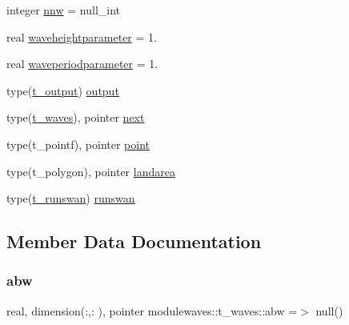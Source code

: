 \begin{DoxyCompactItemize}
\item 
integer \mbox{\hyperlink{structmodulewaves_1_1t__waves_a4acb51d68604f8c07b0594fa4bb7a267}{nnw}} = null\+\_\+int
\item 
real \mbox{\hyperlink{structmodulewaves_1_1t__waves_ab628f8e789892dfdbd634741269523cf}{waveheightparameter}} = 1.
\item 
real \mbox{\hyperlink{structmodulewaves_1_1t__waves_a3b7a438e413d4403bfacfdf8de55ce1f}{waveperiodparameter}} = 1.
\item 
type(\mbox{\hyperlink{structmodulewaves_1_1t__output}{t\+\_\+output}}) \mbox{\hyperlink{structmodulewaves_1_1t__waves_a4d30fd6cc75c89cdaa128717a08a327c}{output}}
\item 
type(\mbox{\hyperlink{structmodulewaves_1_1t__waves}{t\+\_\+waves}}), pointer \mbox{\hyperlink{structmodulewaves_1_1t__waves_ae0b46a0d80af4eebb4d8da8aab828062}{next}}
\item 
type(t\+\_\+pointf), pointer \mbox{\hyperlink{structmodulewaves_1_1t__waves_a77b9bbe50cfc29a1fb6eb6c9a925c4aa}{point}}
\item 
type(t\+\_\+polygon), pointer \mbox{\hyperlink{structmodulewaves_1_1t__waves_afbe188084fb36697091ab156c4b389ef}{landarea}}
\item 
type(\mbox{\hyperlink{structmodulewaves_1_1t__runswan}{t\+\_\+runswan}}) \mbox{\hyperlink{structmodulewaves_1_1t__waves_a39692eba279fbbab185260f41aa14b42}{runswan}}
\end{DoxyCompactItemize}


\subsection{Member Data Documentation}
\mbox{\label{structmodulewaves_1_1t__waves_a22ef70487683258f826e3cf80b87d978}} 
\subsubsection{\texorpdfstring{abw}{abw}}
{\footnotesize\ttfamily real, dimension(\+:,\+:  ), pointer modulewaves\+::t\+\_\+waves\+::abw =$>$ null()\hspace{0.3cm}{\ttfamily [private]}}

\mbox{\label{structmodulewaves_1_1t__waves_a731a0fb6bbd6a571d5e7e7a06031e568}} 
